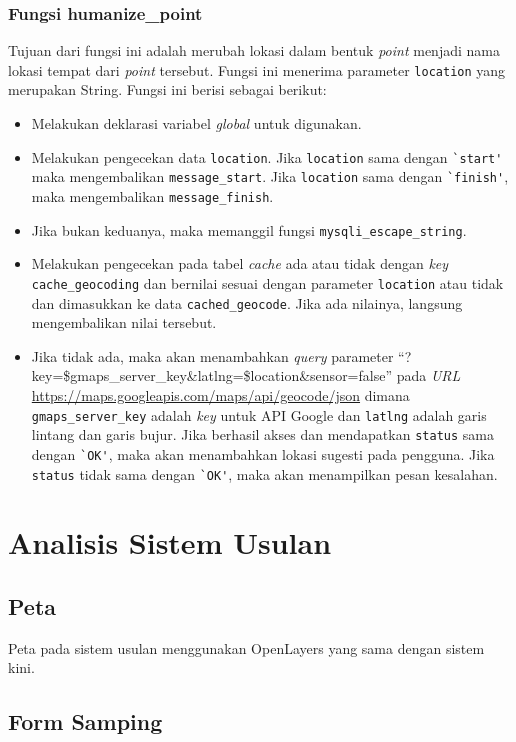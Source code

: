 \subsubsection{Fungsi humanize\_point}
Tujuan dari fungsi ini adalah merubah lokasi dalam bentuk \textit{point} menjadi nama lokasi tempat dari \textit{point} tersebut. Fungsi ini menerima parameter \verb!location! yang merupakan String. Fungsi ini berisi sebagai berikut:
\begin{itemize}
	\item Melakukan deklarasi variabel \textit{global} untuk digunakan.
	\item Melakukan pengecekan data \verb!location!. Jika \verb!location! sama dengan \verb!`start'! maka mengembalikan \verb!message_start!. Jika \verb!location! sama dengan \verb!`finish'!, maka mengembalikan \verb!message_finish!.
	\item Jika bukan keduanya, maka memanggil fungsi \verb!mysqli_escape_string!.
	\item Melakukan pengecekan pada tabel \textit{cache} ada atau tidak dengan \textit{key} \verb!cache_geocoding! dan bernilai sesuai dengan parameter \verb!location! atau tidak dan dimasukkan ke data \verb!cached_geocode!. Jika ada nilainya, langsung mengembalikan nilai tersebut.
	\item Jika tidak ada, maka akan menambahkan \textit{query} parameter ``?key=\$gmaps\_server\_key\&latlng=\$location\&sensor=false'' pada \textit{URL} \url{https://maps.googleapis.com/maps/api/geocode/json} dimana \verb!gmaps_server_key! adalah \textit{key} untuk API Google dan \verb!latlng! adalah garis lintang dan garis bujur. Jika berhasil akses dan mendapatkan \verb!status! sama dengan \verb!`OK'!, maka akan menambahkan lokasi sugesti pada pengguna. Jika \verb!status! tidak sama dengan \verb!`OK'!, maka akan menampilkan pesan kesalahan. 
\end{itemize}

\section{Analisis Sistem Usulan}
\label{sec:perubahan}

\subsection{Peta}
Peta pada sistem usulan menggunakan OpenLayers yang sama dengan sistem kini.

\subsection{Form Samping}
